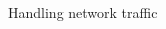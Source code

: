 \documentclass{beamer}
\begin{document}
\begin{frame}[fragile]{Handling network traffic}
\begin{columns}
\begin{column}[t]{0.5\textwidth}
\begin{center}
{     }
\end{center}
\end{column}
\end{columns}
\end{frame}
\end{document}
